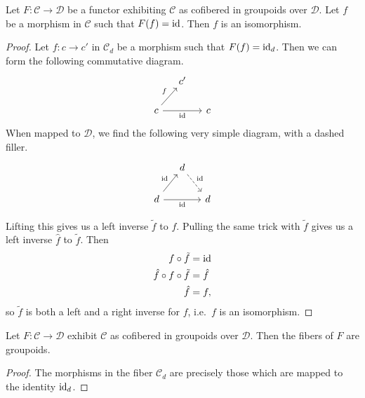 \documentclass[main.tex]{subfiles}
\begin{document}
\begin{lemma}
  \label{lemma:cofibered_in_groupoids_morphism_mapped_to_identity_is_isomorphism}
  Let $F\colon \mathcal{C} \to \mathcal{D}$ be a functor exhibiting $\mathcal{C}$ as cofibered in groupoids over $\mathcal{D}$. Let $f$ be a morphism in $\mathcal{C}$ such that $F(f) = \mathrm{id}$. Then $f$ is an isomorphism.
\end{lemma}
\begin{proof}
  Let $f\colon c \to c'$ in $\mathcal{C}_{d}$ be a morphism such that $F(f) = \mathrm{id}_{d}$. Then we can form the following commutative diagram.
  \begin{equation*}
    \begin{tikzcd}[column sep=small]
      & c'
      \\
      c
      \arrow[ur, "f"]
      \arrow[rr, swap, "\id"]
      & & c
    \end{tikzcd}
  \end{equation*}
  When mapped to $\mathcal{D}$, we find the following very simple diagram, with a dashed filler.
  \begin{equation*}
    \begin{tikzcd}[column sep=small]
      & d
      \arrow[dr, dashed, "\id"]
      \\
      d
      \arrow[ur, "\id"]
      \arrow[rr, swap, "\id"]
      && d
    \end{tikzcd}
  \end{equation*}

  Lifting this gives us a left inverse $\tilde{f}$ to $f$. Pulling the same trick with $\tilde{f}$ gives us a left inverse $\hat{f}$ to $\tilde{f}$. Then
  \begin{align*}
    f \circ \tilde{f} &= \mathrm{id} \\
    \hat{f} \circ f \circ \tilde{f} &= \hat{f} \\
    \hat{f} &= f,
  \end{align*}
  so $\tilde{f}$ is both a left and a right inverse for $f$, i.e.\ $f$ is an isomorphism.
\end{proof}

\begin{corollary}
  \label{cor:fibers_of_fibration_in_groupoids_are_groupoids}
  Let $F\colon \mathcal{C} \to \mathcal{D}$ exhibit $\mathcal{C}$ as cofibered in groupoids over $\mathcal{D}$. Then the fibers of $F$ are groupoids.
\end{corollary}
\begin{proof}
  The morphisms in the fiber $\mathcal{C}_{d}$ are precisely those which are mapped to the identity $\mathrm{id}_{d}$.
\end{proof}
\end{document}

